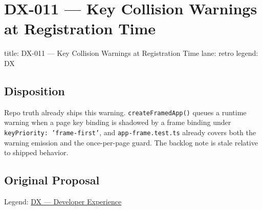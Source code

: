 \chapter{DX-011 --- Key Collision Warnings at Registration Time}\label{record-343}

\smallskip

\begin{RecordMeta}
title: DX-011 — Key Collision Warnings at Registration Time
lane: retro
legend: DX

\end{RecordMeta}

\section{Disposition}\label{record-343-disposition}

Repo truth already ships this warning. \texttt{c\allowbreak{}r\allowbreak{}e\allowbreak{}a\allowbreak{}t\allowbreak{}e\allowbreak{}F\allowbreak{}r\allowbreak{}a\allowbreak{}m\allowbreak{}e\allowbreak{}d\allowbreak{}A\allowbreak{}p\allowbreak{}p\allowbreak{}(\allowbreak{})} queues a runtime warning when a page key binding is shadowed by a frame binding under \texttt{k\allowbreak{}e\allowbreak{}y\allowbreak{}P\allowbreak{}r\allowbreak{}i\allowbreak{}o\allowbreak{}r\allowbreak{}i\allowbreak{}t\allowbreak{}y\allowbreak{}:\allowbreak{} \allowbreak{}'\allowbreak{}f\allowbreak{}r\allowbreak{}a\allowbreak{}m\allowbreak{}e\allowbreak{}-\allowbreak{}f\allowbreak{}i\allowbreak{}r\allowbreak{}s\allowbreak{}t\allowbreak{}'}, and \texttt{a\allowbreak{}p\allowbreak{}p\allowbreak{}-\allowbreak{}f\allowbreak{}r\allowbreak{}a\allowbreak{}m\allowbreak{}e\allowbreak{}.\allowbreak{}t\allowbreak{}e\allowbreak{}s\allowbreak{}t\allowbreak{}.\allowbreak{}t\allowbreak{}s} already covers both the warning emission and the once-per-page guard. The backlog note is stale relative to shipped behavior.

\section{Original Proposal}\label{record-343-original-proposal}

Legend: \href{https://github.com/flyingrobots/bijou/blob/1853ad902f6bf219326409e7f743a5a1d6517dbc/docs/method/legends/DX-developer-experience.md}{DX --- Developer Experience}

